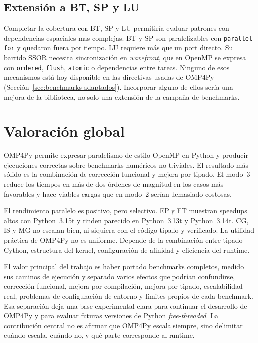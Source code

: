 \subsection{Extensión a BT, SP y LU}
Completar la cobertura con BT, SP y LU permitiría evaluar patrones con
dependencias espaciales más complejas. BT y SP son paralelizables con
\texttt{parallel for} y quedaron fuera por tiempo. LU requiere más que un port
directo. Su barrido SSOR necesita sincronización en \emph{wavefront}, que en
OpenMP se expresa con \texttt{ordered}, \texttt{flush}, \texttt{atomic} o
dependencias entre tareas. Ninguno de esos mecanismos está hoy disponible en las
directivas usadas de OMP4Py (Sección~\ref{sec:benchmarks-adaptados}). Incorporar
alguno de ellos sería una mejora de la biblioteca, no solo una extensión de la
campaña de benchmarks.


\section{Valoración global}
\label{sec:valoracion}

OMP4Py permite expresar paralelismo de estilo OpenMP en Python y producir
ejecuciones correctas sobre benchmarks numéricos no triviales. El resultado más
sólido es la combinación de corrección funcional y mejora por tipado. El
modo~3 reduce los tiempos en más de dos órdenes de magnitud en los casos más
favorables y hace viables cargas que en modo~2 serían demasiado costosas.

El rendimiento paralelo es positivo, pero selectivo. EP y FT muestran speedups
altos con Python~3.15t y rinden parecido en Python~3.13t y Python~3.14t. CG, IS
y MG no escalan bien, ni siquiera con el código tipado y verificado. La utilidad
práctica de OMP4Py no es uniforme. Depende de la combinación entre tipado Cython,
estructura del kernel, configuración de afinidad y eficiencia del runtime.

El valor principal del trabajo es haber portado benchmarks completos, medido sus
caminos de ejecución y separado varios efectos que podrían confundirse,
corrección funcional, mejora por compilación, mejora por tipado, escalabilidad
real, problemas de configuración de entorno y límites propios de cada
benchmark. Esa separación deja una base experimental clara para continuar el
desarrollo de OMP4Py y para evaluar futuras versiones de Python
\emph{free-threaded}. La contribución central no es afirmar que OMP4Py escala
siempre, sino delimitar cuándo escala, cuándo no, y qué parte corresponde al
runtime.
